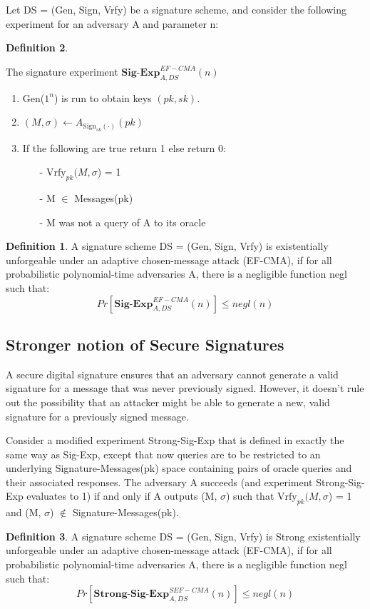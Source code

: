 \documentclass[]{final_report}
\theoremstyle{definition}
\newtheorem{definition}{Definition}[chapter]
\begin{document}
Let DS = (Gen, Sign, Vrfy) be a signature scheme, and consider the following experiment for an adversary A and parameter n:
\begin{definition}
\label{def:EF-CMA}


The signature experiment $\textbf{Sig-Exp}_{A,DS}^{EF-CMA}(n)$
\begin{enumerate}
    \item Gen($1^n$) is run to obtain keys $(pk, sk)$.
    \item \((M, \sigma) \leftarrow A_{\text{Sign}_{sk}(\cdot)}(pk)\)
    \item If the following are true return 1 else return 0: 
    \begin{itemize}
    \item [-] $\text{Vrfy}_{pk} (M, \sigma$) = 1
    \item [-] M $\in$ Messages(pk)
    \item [-] M was not a query of A to its oracle
   \end{itemize}
\end{enumerate}

\begin{definition}
A signature scheme DS = (Gen, Sign, Vrfy) is existentially unforgeable under an adaptive chosen-message attack (EF-CMA), if for all probabilistic polynomial-time adversaries A, there is a negligible function negl such that:
\[ Pr[\textbf{Sig-Exp}_{A,DS}^{EF-CMA}(n)] \leq negl(n) \]

\end{definition}

\end{definition}

\subsection{Stronger notion of Secure Signatures}
A secure digital signature ensures that an adversary cannot generate a valid signature for a message that was never previously signed. However, it doesn't rule out the possibility that an attacker might be able to generate a new, valid signature for a previously signed message.

Consider a modified experiment Strong-Sig-Exp that is defined in exactly the same way as Sig-Exp, except that now queries are to be restricted to an underlying Signature-Messages(pk) space containing pairs of oracle queries and their associated responses.  The adversary A succeeds (and experiment Strong-Sig-Exp evaluates to 1) if and only if A outputs (M, $\sigma$) such that $\text{Vrfy}_{pk} (M, \sigma$) = 1 and (M, $\sigma$) $\notin$ Signature-Messages(pk).
 \begin{definition}
A signature scheme DS = (Gen, Sign, Vrfy) is Strong existentially unforgeable under an adaptive chosen-message attack (EF-CMA), if for all probabilistic polynomial-time adversaries A, there is a negligible function negl such that:
\[ Pr[\textbf{Strong-Sig-Exp}_{A,DS}^{SEF-CMA}(n)] \leq negl(n) \]

\end{definition}
\end{document}
